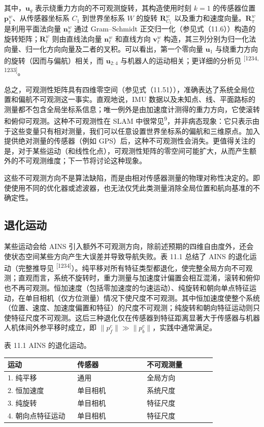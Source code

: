 其中，$\boldsymbol u_g$ 表示绕重力方向的不可观测旋转，其构造使用时刻 $k=1$ 的传感器位置 $\mathbf p_1^w$、从传感器坐标系 $C_1$ 到世界坐标系 $W$ 的旋转 $\boldsymbol R_{C_1}^{w}$ 以及重力和速度向量。$\boldsymbol R_{\pi}^{w}$ 是利用平面法向量 $\mathbf n_{\pi}^{w}$ 通过 Gram--Schmidt 正交归一化（参见式（11.6））构造的旋转矩阵；$\boldsymbol R_{\ell}^{w}$ 则由直线法向量 $\mathbf n_{\ell}^{w}$ 和直线方向 $\mathbf v_{\ell}^{w}$ 构造，其三列分别为归一化法向量、归一化方向向量及二者的叉积。可以看出，第一个零向量 $\boldsymbol u_1$ 与绕重力方向的旋转（因而与偏航）相关，而 $\boldsymbol u_{2:4}$ 与机器人的运动相关；更详细的分析见 \textsuperscript{[1234, 1233]}。

总之，可观测性矩阵具有四维零空间（参见式（11.51）），准确表达了系统全局位置和偏航不可观测这一事实。直观地说，IMU 数据以及未知点、线、平面路标的测量都不包含全局坐标系信息；唯一例外是由加速度计测得的重力方向，它使滚转和俯仰可观测。这种不可观测性在 SLAM 中很常见\textsuperscript{9}，并非病态现象：它只表示由于这些变量只有相对测量，我们可以任意设置世界坐标系的偏航和三维原点。加入提供绝对测量的传感器（例如 GPS）后，这种不可观测性会消失。更值得关注的是，对于某些运动（和线性化点），可观测性矩阵的零空间可能扩大，从而产生额外的不可观测维度；下一节将讨论这种现象。

这些不可观测方向不是算法缺陷，而是由相对传感器测量的物理对称性决定的。即使使用不同的优化器或滤波器，也无法仅凭此类测量消除全局位置和航向基准的不确定性。

\subsection{退化运动}

某些运动会给 AINS 引入额外不可观测方向，除前述预期的四维自由度外，还会使状态空间某些方向产生大误差并导致导航失败。表 11.1 总结了 AINS 的退化运动（完整推导见 \textsuperscript{[1234]}）。纯平移对所有特征类型都退化，使完整全局方向不可观测；直观而言，系统不旋转时，重力测量与加速度计偏置会相互混淆，滚转和俯仰也不再可观测。恒加速度（包括零加速度的匀速运动）、纯旋转和朝向单点特征运动，在单目相机（仅方位测量）情况下使尺度不可观测。其中恒加速度使整个系统（位置、速度、加速度偏置和特征）的尺度不可观测；纯旋转和朝向特征运动则只使特征尺度不可观测。这后三种退化仅在传感器到特征距离显著大于传感器与机器人机体间外参平移时成立，即 $\|p_f^c\|\gg\|p_b^c\|$，实践中通常满足。

表 11.1 AINS 的退化运动。

\small
\setlength{\tabcolsep}{2pt}
\begin{center}
\begin{tabular}{p{0.317\linewidth}p{0.317\linewidth}p{0.317\linewidth}}
\toprule
运动 & 传感器 & 不可观测量 \\
\midrule
1. 纯平移 & 通用 & 全局方向 \\
2. 恒加速度 & 单目相机 & 系统尺度 \\
3. 纯旋转 & 单目相机 & 特征尺度 \\
4. 朝向点特征运动 & 单目相机 & 特征尺度 \\
\bottomrule
\end{tabular}
\end{center}

